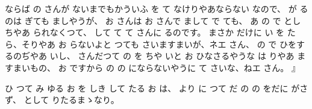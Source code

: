 ならば
の
さんが
ないまでもかういふ
を
て
なけりやあならない
なので、
が
るのは
ぎても
ましやうが、
お
さんは
お
さんで
まして
で
ても、
あ
の
で
としちやあ
られなくつて、
して
て
て
さんに
るのです。
まさか
だけに
い
を
たら、そりやあ
お
らないよと
つても
さいますまいが、ネエ
さん、
の
で
ひをするのぢやあ
いし、
さんだつて
の
を
ちや
いと
お
ひなさるやうな
は
りやあ
ますまいもの、
お
ですから
の
の
にならないやうに
て
さいな、ねエ
さん。
』

ひ
つて
み
ゆる
お
を
しき
して
たる
お
は、
より
に
つて
だ
の
の
をだに
がさず、
として
りたるまゝなり。


